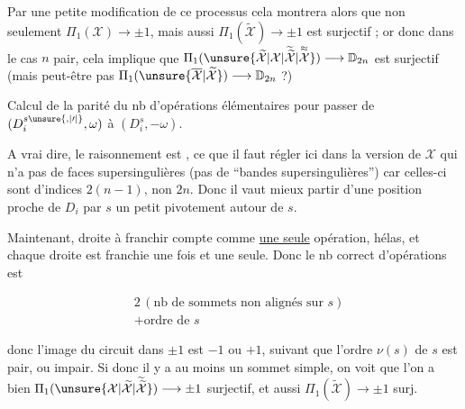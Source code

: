
Par une petite modification de ce processus cela montrera alors que non seulement $\Pi_1(\mathcal X)\longrightarrow\pm1$, mais aussi $\Pi_1(\widetilde{\mathcal X})\longrightarrow\pm1$ est surjectif ; or donc dans le cas $n$ pair, cela implique que $\Pi_1(\unsure{\widetilde{\mathcal X}|\mathcal X|\widetilde{\widetilde{\mathcal X}}|\overset{\approx}{\mathcal X}})\longrightarrow\mathbb D_{2n}$ est surjectif (mais peut-être pas $\Pi_1(\unsure{\overline{\mathcal X}|\widetilde{\mathcal X}})\longrightarrow\mathbb D_{2n}$ ?)

Calcul de la parité du nb d'opérations élémentaires pour passer de $(D_i^{s\unsure{,|\prime|{}}},\omega)$ à $(D_i^{s},-\omega)$.





A vrai dire, le raisonnement est ,  ce que il faut régler ici dans la version de $\mathcal X$ qui n'a pas de faces supersingulières (pas de ``bandes supersingulières'') car celles-ci sont d'indices $2(n-1)$, non $2n$. Donc il vaut mieux partir d'une position proche de $D_i$  par $s$  un petit pivotement autour de $s$.

Maintenant,  droite à franchir compte comme \uline{une seule} opération, hélas, et chaque droite   est franchie une fois et une seule. Donc le nb correct d'opérations est

\[ \begin{aligned}
&2\,(\text{nb de sommets non alignés sur }s)\\
&+\text{ordre de }s
\end{aligned} \]

donc l'image du circuit dans $\pm1$ est $-1$ ou $+1$, suivant que l'ordre  $\nu(s)$ de $s$ est pair, ou impair. Si donc il y a au moins un sommet simple, on voit que l'on a bien $\Pi_1(\unsure{\mathcal X|\widetilde{\mathcal X}|\widetilde{\widetilde{\mathcal X}}})\longrightarrow\pm1$ surjectif, et aussi $\Pi_1(\widetilde{\mathcal X})\longrightarrow\pm1$ surj.
